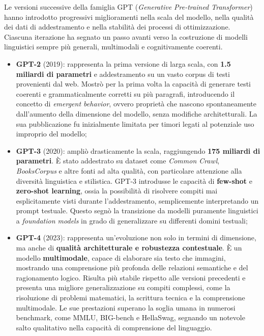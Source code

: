 Le versioni successive della famiglia GPT (\textit{Generative Pre-trained Transformer}) hanno introdotto progressivi miglioramenti nella scala del modello, nella qualità dei dati di addestramento e nella stabilità dei processi di ottimizzazione. Ciascuna iterazione ha segnato un passo avanti verso la costruzione di modelli linguistici sempre più generali, multimodali e cognitivamente coerenti.

\begin{itemize}
    \item \textbf{GPT-2} (2019): rappresenta la prima versione di larga scala, con \textbf{1.5 miliardi di parametri} e addestramento su un vasto corpus di testi provenienti dal web. Mostrò per la prima volta la capacità di generare testi coerenti e grammaticalmente corretti su più paragrafi, introducendo il concetto di \textit{emergent behavior}, ovvero proprietà che nascono spontaneamente dall’aumento della dimensione del modello, senza modifiche architetturali. La sua pubblicazione fu inizialmente limitata per timori legati al potenziale uso improprio del modello;
    \item \textbf{GPT-3} (2020): ampliò drasticamente la scala, raggiungendo \textbf{175 miliardi di parametri}. È stato addestrato su dataset come \textit{Common Crawl}, \textit{BooksCorpus} e altre fonti ad alta qualità, con particolare attenzione alla diversità linguistica e stilistica. GPT-3 introdusse le capacità di \textbf{few-shot} e \textbf{zero-shot learning}, ossia la possibilità di risolvere compiti mai esplicitamente visti durante l’addestramento, semplicemente interpretando un prompt testuale. Questo segnò la transizione da modelli puramente linguistici a \textit{foundation models} in grado di generalizzare su differenti domini testuali;
    \item \textbf{GPT-4} (2023): rappresenta un’evoluzione non solo in termini di dimensione, ma anche di \textbf{qualità architetturale e robustezza contestuale}. È un modello \textbf{multimodale}, capace di elaborare sia testo che immagini, mostrando una comprensione più profonda delle relazioni semantiche e del ragionamento logico. Risulta più stabile rispetto alle versioni precedenti e presenta una migliore generalizzazione su compiti complessi, come la risoluzione di problemi matematici, la scrittura tecnica e la comprensione multimodale. Le sue prestazioni superano la soglia umana in numerosi benchmark, come MMLU, BIG-bench e HellaSwag, segnando un notevole salto qualitativo nella capacità di comprensione del linguaggio.
\end{itemize}

